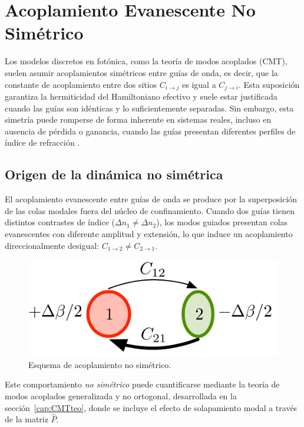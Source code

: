 \chapter{Acoplamiento Evanescente No Simétrico}
\label{cap:asymmetric}

Los modelos discretos en fotónica, como la teoría de modos acoplados (CMT), suelen asumir acoplamientos simétricos entre guías de onda, es decir, que la constante de acoplamiento entre dos sitios \( C_{i \to j} \) es igual a \( C_{j \to i} \). Esta suposición garantiza la hermiticidad del Hamiltoniano efectivo y suele estar justificada cuando las guías son idénticas y lo suficientemente separadas. Sin embargo, esta simetría puede romperse de forma inherente en sistemas reales, incluso en ausencia de pérdida o ganancia, cuando las guías presentan diferentes perfiles de índice de refracción \cite{nonsymm}.

\section{Origen de la dinámica no simétrica}

El acoplamiento evanescente entre guías de onda se produce por la superposición de las colas modales fuera del núcleo de confinamiento. Cuando dos guías tienen distintos contrastes de índice (\( \Delta n_1 \ne \Delta n_2 \)), los modos guiados presentan colas evanescentes con diferente amplitud y extensión, lo que induce un acoplamiento direccionalmente desigual: \( C_{1 \to 2} \ne C_{2 \to 1} \).
\begin{figure}[H]
	\centering
	\includegraphics[width=0.4\linewidth]{media/nonsympaper}
	\caption{Esquema de acoplamiento no simétrico.}
\end{figure}
Este comportamiento \textit{no simétrico} puede cuantificarse mediante la teoría de modos acoplados generalizada y no ortogonal, desarrollada en la sección~\ref{cap:CMTteo}, donde se incluye el efecto de solapamiento modal a través de la matriz \( \hat{P} \).

